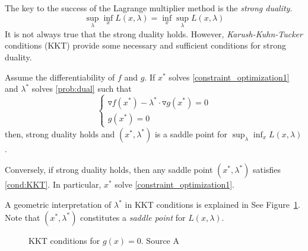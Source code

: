 \documentclass[11pt]{book}
\begin{document}
The key to the success of the Lagrange multiplier method is the \emph{strong duality}.
\begin{equation}
    \sup_{\lambda}\inf_{x} L(x,\lambda)=\inf_{x}\sup_{\lambda}L(x,\lambda)
\end{equation}
It is not always true that the strong duality holds. 
However, \emph{Karush-Kuhn-Tucker} conditions (KKT) provide some necessary and sufficient conditions for strong duality.
\begin{thm}
Assume the differentiability of $f$ and $g$.
    If $x^*$ solves \eqref{constraint_optimization1}  and $\lambda^*$ solves \eqref{prob:dual} such that 
    \begin{equation} \label{cond:KKT}
    \begin{cases} \triangledown f(x^*) - \lambda^* \cdot \triangledown g(x^*) = 0\\
            g (x^*)=0
        \end{cases}
    \end{equation}
    then, strong duality holds and $(x^*,\lambda^*)$ is a saddle point for $\sup_{\lambda}\inf_{x}L(x,\lambda)$. 

    Conversely, if strong duality holds, then any saddle point $(x^*,\lambda^*)$ satisfies \eqref{cond:KKT}. 
    In particular, $x^*$ solve \eqref{constraint_optimization1}.
\end{thm}
A geometric interpretation of $\lambda^*$ in KKT conditions is explained in See Figure~\ref{fig:KKT_1}.
Note that $(x^*,\lambda^*)$ constitutes a \emph{saddle point} for $L(x,\lambda)$.
\begin{figure}
    \centering

    \caption{KKT conditions for $g(x)=0$. Source A}
    \label{fig:KKT_1}
\end{figure}
             
\end{document}
